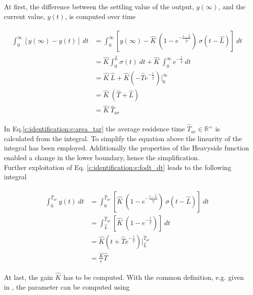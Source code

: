 At first, the difference between the settling value of the output, $y(\infty)$, and the current value, $y(t)$, is computed over time

\begin{align}
\begin{split}
\int_0^\infty \left[ y(\infty)-y(t) \right] ~dt &= \int_0^\infty \left[ y(\infty) - \hat{K} ~\left( 1 - e^{-\frac{t- \hat{L}}{\hat{T}}}\right)~ \sigma(t-\hat{L}) \right] ~dt \\
&= \hat{K} {\int_0^\hat{L}} \sigma(t) ~dt + \hat{K}~{\int^\infty_0} e^{-\frac{t}{\hat{T}}} ~dt \\
&= \hat{K}~\hat{L} + \hat{K} \left( -\hat{T} e^{-\frac{t}{\hat{T}}}\right) \Bigg\rvert^\infty_0 \\
&= \hat{K}~\left(\hat{T}+\hat{L}\right) \\
&= \hat{K}~\hat{T}_{ar}
\end{split}
\label{c:identification:e:area_tar}
\end{align}

In Eq.\ref{c:identification:e:area_tar} the average residence time $\hat{T}_{ar} \in \mathbb{R}^+$ is calculated from the integral. To simplify the equation above the linearity of the integral has been employed. Additionally the properties of the Heavyside function enabled a change in the lower boundary, hence the simplification.\\

Further exploitation of Eq. \ref{c:identification:e:fodt_dt} leads to the following integral

\begin{align}
\begin{split}
\int_0^{\hat{T}_{ar}} y(t) ~dt &= \int_0^{\hat{T}_{ar}} \left[ \hat{K} ~\left( 1 - e^{-\frac{t- \hat{L}}{\hat{T}}}\right)~ \sigma(t-\hat{L}) \right] ~dt \\
&= \int_{\hat{L}}^{\hat{T}_{ar}} \left[ \hat{K} ~\left( 1 - e^{-\frac{t}{\hat{T}}}\right) \right]~dt \\
&= \hat{K} \left( t + \hat{T} e^{-\frac{t}{\hat{T}}} \right) \Bigg\rvert_{\hat{L}}^{\hat{T}_{ar}} \\
&= \frac{\hat{K}}{e} \hat{T}
\end{split}
\label{c:identification:e:area_t}
\end{align}

At last, the gain $\hat{K}$ has to be computed. With the common definition, e.g. given in \cite[p.213]{Lunze2016}, the parameter can be computed using


